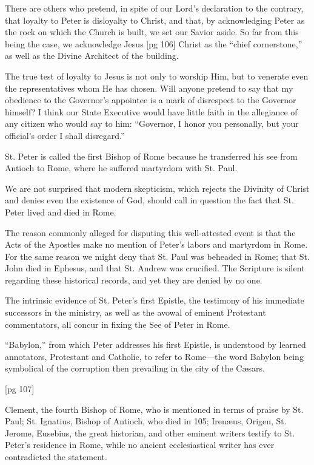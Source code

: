 There are others who pretend, in spite of our
Lord's declaration to the contrary, that loyalty
to Peter is disloyalty to Christ, and that, by acknowledging
Peter as the rock on which the
Church is built, we set our Savior aside. So far
from this being the case, we acknowledge Jesus
[pg 106]
Christ as the “chief cornerstone,” as well as the
Divine Architect of the building.

The true test of loyalty to Jesus is not only
to worship Him, but to venerate even the representatives
whom He has chosen. Will anyone
pretend to say that my obedience to the Governor's
appointee is a mark of disrespect to the Governor
himself? I think our State Executive would
have little faith in the allegiance of any citizen
who would say to him: “Governor, I honor you
personally, but your official's order I shall disregard.”

St. Peter is called the first Bishop of Rome
because he transferred his see from Antioch to
Rome, where he suffered martyrdom with St. Paul.

We are not surprised that modern skepticism,
which rejects the Divinity of Christ and denies
even the existence of God, should call in question
the fact that St. Peter lived and died in Rome.

The reason commonly alleged for disputing this
well-attested event is that the Acts of the Apostles
make no mention of Peter's labors and martyrdom
in Rome. For the same reason we might deny
that St. Paul was beheaded in Rome; that St. John
died in Ephesus, and that St. Andrew was crucified.
The Scripture is silent regarding these historical
records, and yet they are denied by no one.

The intrinsic evidence of St. Peter's first Epistle,
the testimony of his immediate successors in
the ministry, as well as the avowal of eminent
Protestant commentators, all concur in fixing the
See of Peter in Rome.

“Babylon,” from which Peter addresses his
first Epistle, is understood by learned annotators,
Protestant and Catholic, to refer to Rome—the
word Babylon being symbolical of the corruption
then prevailing in the city of the Cæsars.

[pg 107]

Clement, the fourth Bishop of Rome, who is
mentioned in terms of praise by St. Paul; St. Ignatius,
Bishop of Antioch, who died in 105; Irenæus,
Origen, St. Jerome, Eusebius, the great historian,
and other eminent writers testify to St. Peter's
residence in Rome, while no ancient ecclesiastical
writer has ever contradicted the statement.

